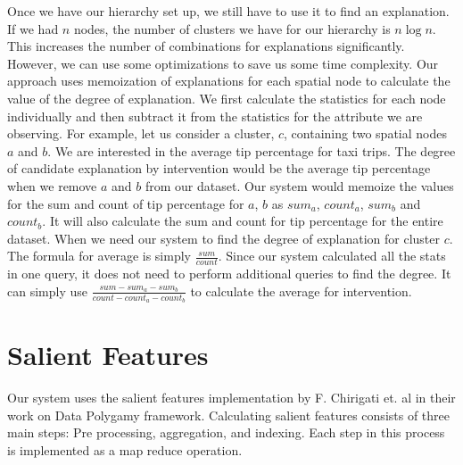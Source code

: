 Once we have our hierarchy set up, we still have to use it to find an explanation. If we had $n$ nodes, the number of clusters we have for our hierarchy is $n \log n$.  This increases the number of combinations for explanations significantly. However, we can use some optimizations to save us some time complexity. Our approach uses memoization of explanations for each spatial node to calculate the value of the degree of explanation. We first calculate the statistics for each node individually and then subtract it from the statistics for the attribute we are observing. For example, let us consider a cluster, $c$, containing two spatial nodes $a$ and $b$. We are interested in the average tip percentage for taxi trips. The degree of candidate explanation by intervention would be the average tip percentage when we remove $a$ and $b$ from our dataset. Our system would memoize the values for the sum and count of tip percentage for $a$, $b$ as $sum_a$, $count_a$, $sum_b$ and $count_b$. It will also calculate the sum and count for tip percentage for the entire dataset. When we need our system to find the degree of explanation for cluster $c$. The formula for average is simply $\frac{sum}{count}$. Since our system calculated all the stats in one query, it does not need to perform additional queries to find the degree. It can simply use $\frac{sum-sum_a-sum_b}{count-count_a-count_b}$ to calculate the average for intervention.

\section{Salient Features}
Our system uses the salient features implementation by F. Chirigati et. al in their work on Data Polygamy framework. Calculating salient features consists of three main steps: Pre processing, aggregation, and indexing. Each step in this process is implemented as a map reduce operation. 

